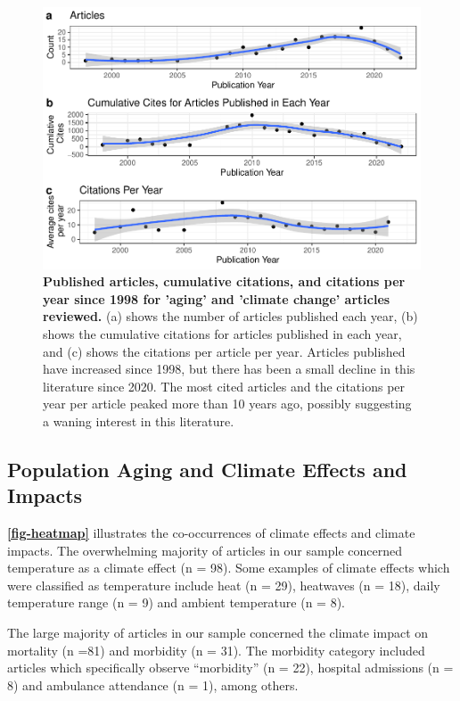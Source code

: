 \documentclass[12pt]{article}
\begin{document}
\begin{figure}
\centering
\includegraphics{MainDocument_files/figure-latex/mapandtimelines-1.pdf}
\caption{\textbf{Published articles, cumulative citations, and citations per year since 1998 for 'aging' and 'climate change' articles reviewed.}
(a) shows the number of articles published each year, (b) shows the
cumulative citations for articles published in each year, and (c) shows
the citations per article per year. Articles published have increased
since 1998, but there has been a small decline in this literature since
2020. The most cited articles and the citations per year per article
peaked more than 10 years ago, possibly suggesting a waning interest in
this literature. \label{fig-timelines}}
\end{figure}

\hypertarget{population-aging-and-climate-effects-and-impacts}{%
\subsection{Population Aging and Climate Effects and
Impacts}\label{population-aging-and-climate-effects-and-impacts}}

\textbf{\autoref{fig-heatmap}} illustrates the co-occurrences of climate
effects and climate impacts. The overwhelming majority of articles in
our sample concerned temperature as a climate effect (n = 98). Some
examples of climate effects which were classified as temperature include
heat (n = 29), heatwaves (n = 18), daily temperature range (n = 9) and
ambient temperature (n = 8).

The large majority of articles in our sample concerned the climate
impact on mortality (n =81) and morbidity (n = 31). The morbidity
category included articles which specifically observe ``morbidity'' (n =
22), hospital admissions (n = 8) and ambulance attendance (n = 1), among
others.
\end{document}
